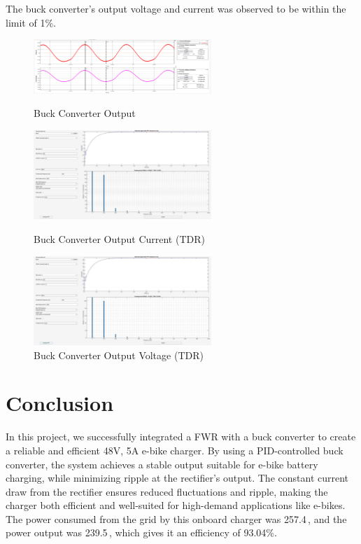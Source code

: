 \documentclass[12pt]{article}
\begin{document}
\newpage

The buck converter's output voltage and current was observed to be within the limit of 1\%.

\begin{figure}[h]
    \centering
    \includegraphics[width=0.6\textwidth]{img/Buck_VnI.png}
    \caption{Buck Converter Output}

    \centering
    \includegraphics[width=0.6\textwidth]{img/Buck_Iout.jpg}
    \caption{Buck Converter Output Current (TDR)}

    \centering
    \includegraphics[width=0.6\textwidth]{img/Buck_Vout.jpg}
    \caption{Buck Converter Output Voltage (TDR)}
\end{figure}

\newpage

\section*{Conclusion}
In this project, we successfully integrated a FWR with a buck converter to create a reliable and efficient 48V, 5A e-bike charger. By using a PID-controlled buck converter, the system achieves a stable output suitable for e-bike battery charging, while minimizing ripple at the rectifier's output. The constant current draw from the rectifier ensures reduced fluctuations and ripple, making the charger both efficient and well-suited for high-demand applications like e-bikes.\\
The power consumed from the grid by this onboard charger was 257.4\,, and the power output was 239.5\,, which gives it an efficiency of 93.04\%.\\
\end{document}

